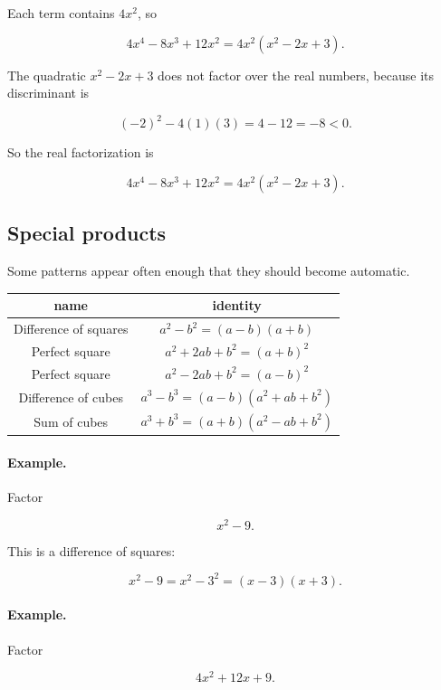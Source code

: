 Each term contains \(4x^2\), so

\[
4x^4-8x^3+12x^2
=
4x^2(x^2-2x+3).
\]

The quadratic \(x^2-2x+3\) does not factor over the real numbers, because its
discriminant is

\[
(-2)^2-4(1)(3)=4-12=-8<0.
\]

So the real factorization is

\[
\boxed{
4x^4-8x^3+12x^2=4x^2(x^2-2x+3).
}
\]

\subsection{Special products}
\label{appsubsec:special-products}

Some patterns appear often enough that they should become automatic.

\begin{center}
\renewcommand{\arraystretch}{1.6}
\begin{tabular}{c|c}
\textbf{name} & \textbf{identity} \\ \hline
Difference of squares &
\(\displaystyle a^2-b^2=(a-b)(a+b)\) \\

Perfect square &
\(\displaystyle a^2+2ab+b^2=(a+b)^2\) \\

Perfect square &
\(\displaystyle a^2-2ab+b^2=(a-b)^2\) \\

Difference of cubes &
\(\displaystyle a^3-b^3=(a-b)(a^2+ab+b^2)\) \\

Sum of cubes &
\(\displaystyle a^3+b^3=(a+b)(a^2-ab+b^2)\)
\end{tabular}
\end{center}

\paragraph{Example.}
Factor

\[
x^2-9.
\]

This is a difference of squares:

\[
x^2-9=x^2-3^2=(x-3)(x+3).
\]

\paragraph{Example.}
Factor

\[
4x^2+12x+9.
\]

